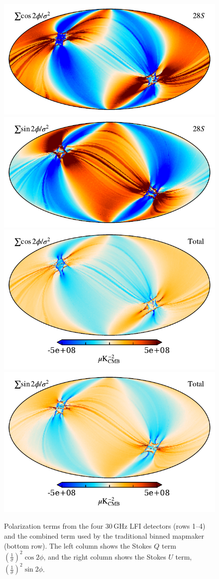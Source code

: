 \documentclass{aa}
\begin{document}
\begin{figure}[t]
  \includegraphics[width=0.47\linewidth]{figs/map_Q_polang28S.pdf}
  \includegraphics[width=0.47\linewidth]{figs/map_U_polang28S.pdf}\\
  \includegraphics[width=0.47\linewidth]{figs/map_Q_polang_all.pdf}
  \includegraphics[width=0.47\linewidth]{figs/map_U_polang_all.pdf}\\
  \caption{Polarization terms from the four 30\,GHz LFI detectors (rows 1--4) and the combined term used by the traditional binned mapmaker (bottom row). The left column shows the Stokes $Q$ term $(\frac{1}{\sigma})^2 \cos2\phi$, and the right column shows the Stokes $U$ term, $(\frac{1}{\sigma})^2 \sin2\phi$.}
  \label{fig:polangles}
\end{figure}


\end{document}
